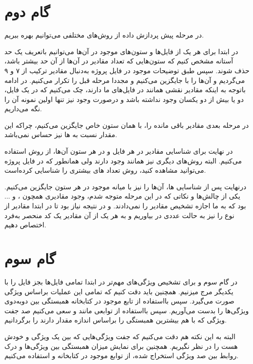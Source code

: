 \documentclass{article}
\begin{document}
\newpage
\section{گام دوم}
در مرحله پیش پردازش داده از روش‌های مختلفی می‌توانیم بهره ببریم. 

در ابتدا برای هر یک از فایل‌ها و ستون‌های موجود در آن‌ها می‌توانیم باتعریف یک حد آستانه مشخص کنیم که ستون‌هایی که تعداد مقادیر  در آن‌ها از آن حد بیشتر باشد، حذف شوند.
سپس طبق توضیحات موجود در فایل پروژه به‌دنبال مقادیر ترکیب از ۷ و ۹ می‌گردیم و آن‌ها را با  جایگزین می‌کنیم و مجددا مرحله قبل را تکرار می‌کنیم. در ادامه باتوجه به اینکه مقادیر  نقشی همانند  در فایل‌های ما دارند، چک می‌کنیم که در یک فایل، دو یا بیش از دو  یکسان وجود نداشته باشد و درصورت وجود نیز تنها اولین نمونه آن را نگه می‌داریم.

در مرحله بعدی مقادیر  باقی مانده را، با  همان ستون خاص جایگزین می‌کنیم، چراکه این مقدار نسبت به ها نیز حساس نمی‌باشد.

در نهایت برای شناسایی مقادیر  در هر فایل و در هر ستون آن‌ها، از روش  استفاده می‌کنیم. البته روش‌های دیگری نیز همانند  وجود دارند ولی همانطور که در فایل پروژه می‌توانید مشاهده کنید، روش  تعداد های بیشتری را شناسایی کرده‌است.

درنهایت پس از شناسایی ها، آن‌ها را نیز با میانه موجود در هر ستون جایگزین می‌کنیم.
یکی از چالش‌ها و نکاتی که در این مرحله متوجه شدم، وجود مقادیری همچون ،  و ... بود که به ما اجازه تشخیص مقادیر  را نمی‌دادند. و در نتیجه نیاز بود تا در ابتدا مقادیر از نوع  را نیز به حالت عددی در بیاوریم و به هر یک از آن مقادیر یک کد منحصر به‌فرد اختصاص دهیم.
\newpage
\section{گام سوم}
در گام سوم و برای تشخیص ویژگی‌های مهم‌تر در ابتدا تمامی فایل‌ها بجز فایل  را با یکدیگر مرج میزنیم. همچنین باید دقت کنیم که تمامی این عملیات براساس ویژگی  صورت می‌‌گیرد.
سپس بااستفاده از تابع  موجود در کتابخانه  همبستگی بین دوبه‌دوی ویژگی‌ها را بدست می‌آوریم. سپس بااستفاده از توابعی مانند  و  سعی می‌کنیم صد جفت ویژگی که با هم بیشترین همبستگی را براساس اندازه مقدار  دارند را برگردانیم.

البته به این نکته هم دقت می‌کنیم که جفت ویژگی‌هایی که بین یک ویژگی و خودش هست را در نظر نگیریم.
همچنین برای نمایش میزان همبستگی بین ویژگی‌ها و درک روابط بین صد ویژگی استخراج شده، از توابع موجود در کتابخانه  و  استفاده می‌کنیم.
\end{document}
